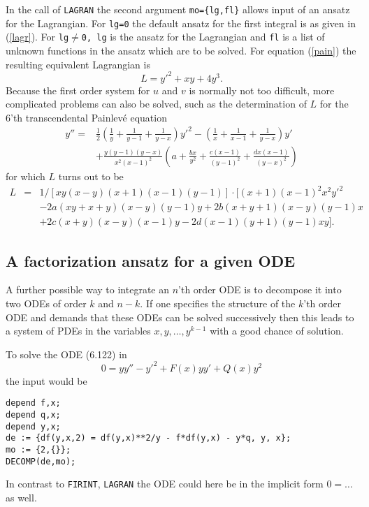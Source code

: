    In the call of {\tt LAGRAN} the second argument {\tt mo=\{lg,fl\}} allows 
input of an ansatz for the Lagrangian.
For {\tt lg=0} the default ansatz for the first integral is as given in
(\ref{lagr}).
For {\tt lg$\neq$0, lg} is the ansatz for the Lagrangian and {\tt fl} is a 
list of unknown functions in the ansatz which are to be solved.
For equation (\ref{pain}) the resulting equivalent Lagrangian is
\[ L = y'^2 + xy + 4y^3. \]
Because the first order system for $u$ and $v$ is normally not too
difficult, more complicated problems can also be solved, such as the 
determination of $L$ for the 6'th transcendental Painlev\'{e} equation 
\begin{eqnarray}
 y'' = & \frac{1}{2}\left(\frac{1}{y}+\frac{1}{y-1}+\frac{1}{y-x}\right) y'^2
- \left(\frac{1}{x}+\frac{1}{x-1}+\frac{1}{y-x}\right)y'  \nonumber \\
& + \frac{y(y-1)(y-x)}{x^2(x-1)^2}\left(a+\frac{bx}{y^2}+\frac{c(x-1)}{(y-1)^2}
+\frac{dx(x-1)}{(y-x)^2}\right)            
\end{eqnarray}
for which $L$ turns out to be
\[
\begin{array}{rcll}
L & = & 1/[xy(x-y)(x+1)(x-1)(y-1)] \cdot [(x+1)(x-1)^2x^2y'^2  \\
  &   & - 2a(xy+x+y)(x-y)(y-1)y + 2b(x+y+1)(x-y)(y-1)x \\
  &   & + 2c(x+y)(x-y)(x-1)y  - 2d(x-1)(y+1)(y-1)xy ].
\end{array} \]

\subsection{A factorization ansatz for a given ODE}
A further possible way to integrate an $n$'th order ODE is to decompose it
into two ODEs of order $k$ and $n-k$. If one specifies the structure of the
$k$'th order ODE and demands that these ODEs can be solved successively then 
this leads to a system of PDEs in the variables 
$x, y, \ldots, y^{k-1}$ with a good chance of solution.

To solve the ODE (6.122) in \cite{Ka}
\begin{equation}
0 = yy'' - y'^2 + F(x)yy' + Q(x)y^2       \label{6.122}
\end{equation}
the input would be
\begin{verbatim}
depend f,x;
depend q,x;
depend y,x;
de := {df(y,x,2) = df(y,x)**2/y - f*df(y,x) - y*q, y, x};
mo := {2,{}};
DECOMP(de,mo);
\end{verbatim}
In contrast to {\tt FIRINT}, {\tt LAGRAN} the ODE could here
be in the implicit form $0 = \ldots \;$ as well.

